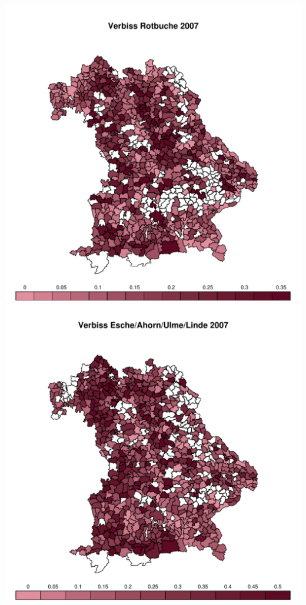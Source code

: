 \documentclass[landscape]{slides}
\begin{document}
\begin{center}
\includegraphics[height=\textheight]{figs/rotbuche2007}
\includegraphics[height=\textheight]{figs/esche2007}

\end{center}
\end{document}
